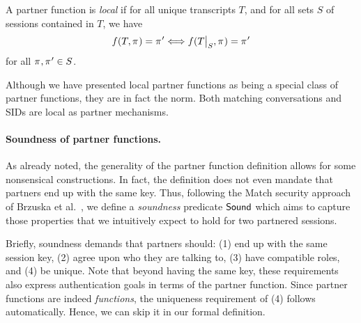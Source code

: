 \begin{definition}\label{def:local_partnering}
A partner function is \emph{local} if for all unique transcripts $T$,
and for all sets $S$ of sessions contained in $T$,
we have 
\begin{equation}
	f(T,\oracle) = \oracle' \Longleftrightarrow f(\restrict{T}{S}, \oracle) = \oracle' 
\end{equation}
for all $\oracle, \oracle' \in S$.
\end{definition}


Although we have presented local partner functions as being a special class of partner functions,
they are in fact the norm.
Both matching conversations and SIDs are local as partner mechanisms.









\paragraph{Soundness of partner functions.}
As already noted,
the generality of the partner function definition allows for some nonsensical constructions.
In fact,
the definition does not even mandate that partners end up with the same key.
Thus,
following the \textsf{Match} security approach of Brzuska et al.~\cite{CCS:BFWW11},
we define a \emph{soundness} predicate $\mathsf{Sound}$ which aims to capture those properties that we intuitively expect to hold for two partnered sessions.


Briefly,
soundness demands that partners should:
(1) end up with the same session key,
(2) agree upon who they are talking to,
(3) have compatible roles, and
(4) be unique. 
Note that beyond having the same key,
these requirements also express authentication goals in terms of the partner function.
Since partner functions are indeed \emph{functions},
the uniqueness requirement of (4) follows automatically.
Hence,
we can skip it in our formal definition.





